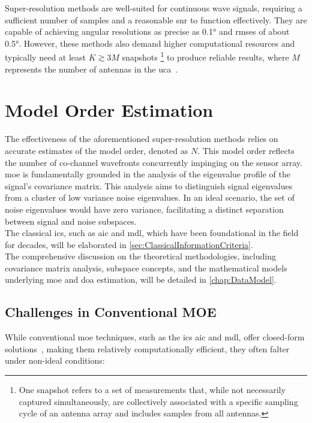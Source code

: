 Super-resolution methods are well-suited for continuous wave signals, requiring a sufficient number of
samples and a reasonable \gls{snr} to function effectively. They are capable of achieving angular resolutions as precise
as 0.1° and \glspl{rmse} of about 0.5°. However, these methods also demand higher computational resources and typically
need at least \( K \gtrsim 3M \) snapshots%
\footnote{One snapshot refers to a set of measurements that, while not necessarily captured simultaneously, are
collectively associated with a specific sampling cycle of an antenna array and includes samples from all antennas.
}
to produce reliable results, where \( M \) represents the number of antennas in
the \gls{uca}~\cite{tuncer.ch1}.


\section{Model Order Estimation}
The effectiveness of the aforementioned super-resolution methods relies on accurate estimates of the model order,
denoted as \( N \). This model order reflects the number of co-channel wavefronts concurrently impinging on the sensor array.\\
\gls{moe} is fundamentally grounded in the analysis of the eigenvalue profile of the signal's covariance matrix.
This analysis aims to distinguish signal eigenvalues from a cluster of low variance noise eigenvalues.
In an ideal scenario, the set of noise eigenvalues would have zero variance, facilitating a distinct separation between
signal and noise subspaces.\\
The classical \glspl{ic}, such as \gls{aic} and \gls{mdl}, which have been foundational in the field
for decades, will be elaborated in \autoref{sec:ClassicalInformationCriteria}.\\
The comprehensive discussion on the theoretical methodologies, including covariance matrix analysis, subspace concepts,
and the mathematical models underlying \gls{moe} and \gls{doa} estimation, will be detailed in \autoref{chap:DataModel}.


\subsection{Challenges in Conventional MOE}
While conventional \gls{moe} techniques, such as the \glspl{ic} \gls{aic} and \gls{mdl}, offer closed-form
solutions~\cite{barthelme2020}, making them relatively computationally efficient, they often falter under non-ideal
conditions:

